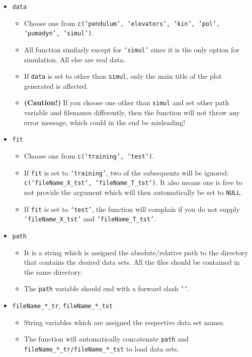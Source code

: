 \documentclass[11pt]{article}
\begin{document}
  \begin{itemize}
    \item \texttt{data}
      \begin{itemize}
        \item Choose one from \texttt{c(`pendulum', `elevators', `kin', `pol', `pumadyn', `simul')}.
        \item All function similarly except for \texttt{`simul'} since it is the only option for simulation. All else are real data.
        \item If \texttt{data} is set to other than \texttt{simul}, only the main title of the plot generated is affected.
        \item \textbf{(Caution!)} If you choose one other than \texttt{simul} and set other path variable and filenames differently, then the function will not throw any error message, which could in the end be misleading! 
      \end{itemize}
    \item \texttt{fit}
      \begin{itemize}
        \item Choose one from \texttt{c(`training', `test')}.
        \item If \texttt{fit} is set to \texttt{`training'}, two of the subsequents will be ignored: \texttt{c(`fileName\_X\_tst', `fileName\_T\_tst')}. It also means one is free to not provide the argument which will then automatically be set to \texttt{NULL}.
        \item If \texttt{fit} is set to \texttt{`test'}, the function will complain if you do not supply \texttt{`fileName\_X\_tst'} and \texttt{`fileName\_T\_tst'}.
      \end{itemize}
    \item \texttt{path}
      \begin{itemize}
        \item It is a string which is assigned the absolute/relative path to the directory that contains the desired data sets. All the files should be contained in the same directory.
        \item The \texttt{path} variable should end with a forward slash \texttt{`\/'}.
      \end{itemize}
    \item \texttt{fileName\_*\_tr}, \texttt{fileName\_*\_tst}
      \begin{itemize}
        \item String variables which are assigned the respective data set names.
        \item The function will automatically concatenate \texttt{path} and \texttt{fileName\_*\_tr/fileName\_*\_tst} to load data sets.
      \end{itemize}
  \end{itemize}
\end{document}
